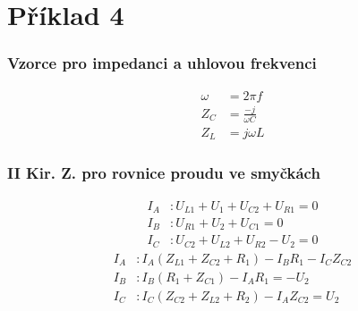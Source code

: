\section{Příklad 4}
\subsubsection{Vzorce pro impedanci a uhlovou frekvenci}
\begin{align*}
\omega &= 2 \pi f\\
Z_C &= \frac{-j}{\omega C}\\
Z_L &= j \omega L
\end{align*}
\subsubsection{II Kir. Z. pro rovnice proudu ve smyčkách}
\begin{align*}
I_A &: U_{L1} + U_1 + U_{C2} + U_{R1} = 0\\
I_B &: U_{R1} + U_2 + U_{C1} = 0\\
I_C &: U_{C2} + U_{L2} + U_{R2} - U_2 = 0
\end{align*}
\begin{align*}
I_A &: I_A (Z_{L1} + Z_{C2} + R_1) - I_BR_1 - I_CZ_{C2}\\
I_B &: I_B (R_1 + Z_{C1}) - I_AR_1 = -U_2\\
I_C &: I_C (Z_{C2} + Z_{L2} + R_2) - I_A Z_{C2} = U_2
\end{align*}
